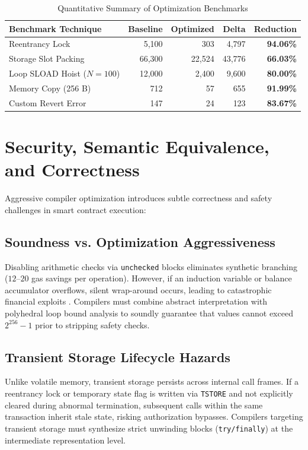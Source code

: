 \documentclass[conference]{IEEEtran}
\begin{document}
\begin{table}[htbp]
\caption{Quantitative Summary of Optimization Benchmarks}
\begin{center}
\begin{tabular}{lrrrr}
\toprule
\textbf{Benchmark Technique} & \textbf{Baseline} & \textbf{Optimized} & \textbf{Delta} & \textbf{Reduction} \\
\midrule
Reentrancy Lock & 5,100 & 303 & 4,797 & \textbf{94.06\%} \\
Storage Slot Packing & 66,300 & 22,524 & 43,776 & \textbf{66.03\%} \\
Loop SLOAD Hoist ($N=100$) & 12,000 & 2,400 & 9,600 & \textbf{80.00\%} \\
Memory Copy (256 B) & 712 & 57 & 655 & \textbf{91.99\%} \\
Custom Revert Error & 147 & 24 & 123 & \textbf{83.67\%} \\
\bottomrule
\end{tabular}
\end{center}
\label{tab:results}
\end{table}

\section{Security, Semantic Equivalence, and Correctness}

Aggressive compiler optimization introduces subtle correctness and safety challenges in smart contract execution:

\subsection{Soundness vs. Optimization Aggressiveness}
Disabling arithmetic checks via \texttt{unchecked} blocks eliminates synthetic branching ($12$--$20$ gas savings per operation). However, if an induction variable or balance accumulator overflows, silent wrap-around occurs, leading to catastrophic financial exploits \cite{torres2018osiris}. Compilers must combine abstract interpretation with polyhedral loop bound analysis to soundly guarantee that values cannot exceed $2^{256}-1$ prior to stripping safety checks.

\subsection{Transient Storage Lifecycle Hazards}
Unlike volatile memory, transient storage persists across internal call frames. If a reentrancy lock or temporary state flag is written via \texttt{TSTORE} and not explicitly cleared during abnormal termination, subsequent calls within the same transaction inherit stale state, risking authorization bypasses. Compilers targeting transient storage must synthesize strict unwinding blocks (\texttt{try/finally}) at the intermediate representation level.
\end{document}
